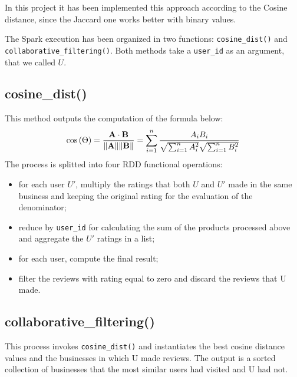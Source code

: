 \documentclass{article}
\begin{document}
In this project it has been implemented this approach according to the Cosine distance, since the Jaccard one works better with binary values. 

The Spark execution has been organized in two functions: \texttt{cosine\_dist()} and \texttt{collaborative\_filtering()}. Both methods take a \texttt{user\_id} as an argument, that we called $U$. 
    \subsection{cosine\_dist()}
    This method outputs the computation of the formula below:
    $$
    \cos{(\Theta)} = \frac{\mathbf{A}\cdot\mathbf{B}}{\norm{\mathbf{A}}\norm{\mathbf{B}}} = \sum_{i=1}^{n}\frac{A_iB_i}{\sqrt{\sum_{i=1}^{n}A^2_i}\sqrt{\sum_{i=1}^{n}B^2_i}}
    $$
    The process is splitted into four RDD functional operations:
    \begin{itemize}
        \item for each user $U'$, multiply the ratings that both $U$ and $U'$ made in the same business and keeping the original rating for the evaluation of the denominator;
        
        \item reduce by \texttt{user\_id} for calculating the sum of the products processed above and aggregate the $U'$ ratings in a list;
        \item for each user, compute the final result; %
        \item filter the reviews with rating equal to zero and discard the reviews that U made. 
    \end{itemize}

    \subsection{collaborative\_filtering()}
    This process invokes \texttt{cosine\_dist()} and instantiates the best cosine distance values and the businesses in which U made reviews. The output is a sorted collection of businesses that the most similar users had visited and U had not. 
\end{document}

